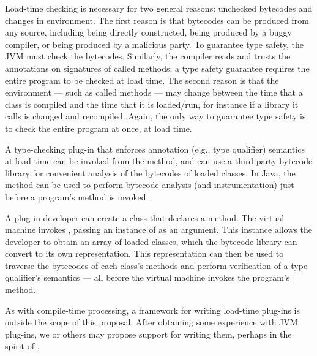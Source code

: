 \documentclass[10pt]{article}
\begin{document}
Load-time checking is necessary for two general reasons:  unchecked
bytecodes and changes in environment.
%
The first reason is that bytecodes can be produced from any source,
including being directly constructed, being produced by a buggy compiler,
or being produced by a malicious party.  To guarantee type safety, the JVM
must check the bytecodes.  Similarly, the compiler reads and trusts the
annotations on signatures of called methods; a type safety guarantee
requires the entire program to be checked at load time.
%
The second reason is that the environment --- such as called methods ---
may change between the time that a class is compiled and the time that it
is loaded/run, for instance if a library it calls is changed and
recompiled.  Again, the only way to guarantee type safety is to check the
entire program at once, at load time.

A type-checking plug-in that enforces annotation (e.g., type qualifier) semantics at load time can be
invoked from the  method, and can use a third-party bytecode
library for convenient analysis of the bytecodes of loaded classes. In
Java, the  method can be used to perform bytecode
analysis (and instrumentation) just before a program's 
method is invoked.

A plug-in developer can create a class that declares a 
method.  The virtual machine invokes , passing an
instance of  as an
argument. This instance allows the developer to obtain an array of
loaded classes, which the bytecode library can convert to its own
representation. This representation can then be used to traverse the
bytecodes of each class's methods and perform verification of a type
qualifier's semantics --- all before the virtual machine invokes the
program's  method.

As with compile-time processing, 
a framework for writing load-time plug-ins is outside the scope of this
proposal.  After obtaining some experience with JVM plug-ins, we or
others may propose support for writing them, perhaps
in the spirit of \cite{Fong2004}.



\end{document}
